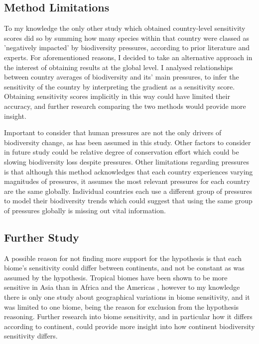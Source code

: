\documentclass[11pt, a4paper, titlepage]{article}
\begin{document}
	
	\subsection*{Method Limitations}
     
     To my knowledge the only other study which obtained country-level sensitivity scores  \citep{louette2010bioscore} did so by summing how many species within that country were classed as 'negatively impacted' by biodiversity pressures, according to prior literature and experts. For aforementioned reasons, I decided to take an alternative approach in the interest of obtaining results at the global level. I analysed relationships between country averages of biodiversity and its' main pressures, to infer the sensitivity of the country by interpreting the gradient as a sensitivity score. Obtaining sensitivity scores implicitly in this way could have limited their accuracy, and further research comparing the two methods would provide more insight.
     
	Important to consider that human pressures are not the only drivers of biodiversity change, as has been assumed in this study. Other factors to consider in future study could be relative degree of conservation effort which could be slowing biodiversity loss despite pressures. Other limitations regarding pressures is that although this method acknowledges that each country experiences varying magnitudes of pressures, it assumes the most relevant pressures for each country are the same globally. Individual countries each use a different group of pressures to model their biodiversity trends \citep{henly2021biodiversity} which could suggest that using the same group of pressures globally is missing out vital information.
	
     
     \subsection*{Further Study}
     
     A possible reason for not finding more support for the hypothesis is that each biome's sensitivity could differ between continents, and not be constant as was assumed by the hypothesis. Tropical biomes have been shown to be more sensitive in Asia than in Africa and the Americas \citep{gibson2011primary}, however to my knowledge there is only one study about geographical variations in biome sensitivity, and it was limited to one biome, being the reason for exclusion from the hypothesis reasoning. Further research into biome sensitivity, and in particular how it differs according to continent, could provide more insight into how continent biodiversity sensitivity differs. 
     
\end{document}
